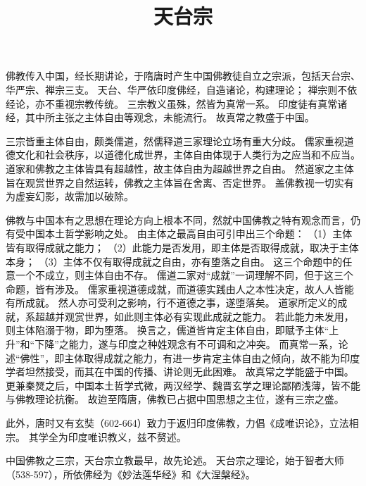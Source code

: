 \documentclass[11pt]{article}
\title{天台宗}
\date{}
\begin{document}
  \maketitle

  \linenumbers

佛教传入中国，经长期讲论，于隋唐时产生中国佛教徒自立之宗派，包括天台宗、华严宗、禅宗三支。
天台、华严依印度佛经，自造诸论，构建理论；
禅宗则不依经论，亦不重视宗教传统。
三宗教义虽殊，然皆为真常一系。
印度徒有真常诸经，其中所主张之主体自由等观念，未能流行。
故真常之教盛于中国。

\par

三宗皆重主体自由，颇类儒道，然儒释道三家理论立场有重大分歧。
儒家重视道德文化和社会秩序，以道德化成世界，主体自由体现于人类行为之应当和不应当。
道家和佛教之主体皆具有超越性，故主体自由为超越世界之自由。
然道家之主体旨在观赏世界之自然运转，佛教之主体旨在舍离、否定世界。
盖佛教视一切实有为虚妄幻影，故需加以破除。

\par

佛教与中国本有之思想在理论方向上根本不同，然就中国佛教之特有观念而言，仍有受中国本土哲学影响之处。
由主体之最高自由可引申出三个命题：
（1）主体皆有取得成就之能力；
（2）此能力是否发用，即主体是否取得成就，取决于主体本身；
（3）主体不仅有取得成就之自由，亦有堕落之自由。
这三个命题中的任意一个不成立，则主体自由不存。
儒道二家对“成就”一词理解不同，但于这三个命题，皆有涉及。
儒家重视道德成就，而道德实践由人之本性决定，故人人皆能有所成就。
然人亦可受利之影响，行不道德之事，遂堕落矣。
道家所定义的成就，系超越并观赏世界，如此则主体必有实现此成就之能力。
若此能力未发用，则主体陷溺于物，即为堕落。
换言之，儒道皆肯定主体自由，即赋予主体“上升”和“下降”之能力，遂与印度之种姓观念有不可调和之冲突。
而真常一系，论述“佛性”，即主体取得成就之能力，有进一步肯定主体自由之倾向，故不能为印度学者坦然接受，而其在中国的传播、讲论则无此困难。
故真常之学能盛于中国。
更兼秦燹之后，中国本土哲学式微，两汉经学、魏晋玄学之理论鄙陋浅薄，皆不能与佛教理论抗衡。
故迨至隋唐，佛教已占据中国思想之主位，遂有三宗之盛。

\par

此外，唐时又有玄奘（602-664）致力于返归印度佛教，力倡《成唯识论》，立法相宗。
其学全为印度唯识教义，兹不赘述。

\par

中国佛教之三宗，天台宗立教最早，故先论述。
天台宗之理论，始于智者大师（538-597），所依佛经为《妙法莲华经》和《大涅槃经》。
\end{document}
